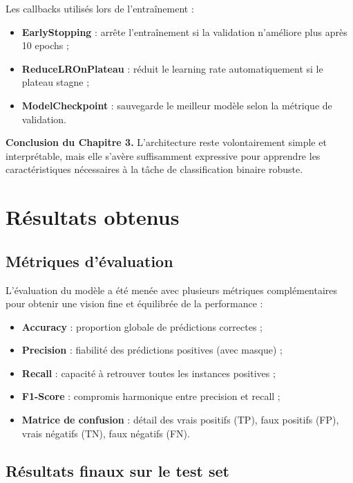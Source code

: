 \documentclass[11pt,a4paper]{article}
\begin{document}
Les callbacks utilisés lors de l'entraînement :
\begin{itemize}
    \item \textbf{EarlyStopping} : arrête l'entraînement si la validation n'améliore plus après 10 epochs ;
    \item \textbf{ReduceLROnPlateau} : réduit le learning rate automatiquement si le plateau stagne ;
    \item \textbf{ModelCheckpoint} : sauvegarde le meilleur modèle selon la métrique de validation.
\end{itemize}

\textbf{Conclusion du Chapitre 3.} L'architecture reste volontairement simple et interprétable, mais elle s'avère suffisamment expressive pour apprendre les caractéristiques nécessaires à la tâche de classification binaire robuste.

\newpage
\section{Résultats obtenus}

\subsection{Métriques d'évaluation}

L'évaluation du modèle a été menée avec plusieurs métriques complémentaires pour obtenir une vision fine et équilibrée de la performance :
\begin{itemize}
    \item \textbf{Accuracy} : proportion globale de prédictions correctes ;
    \item \textbf{Precision} : fiabilité des prédictions positives (avec masque) ;
    \item \textbf{Recall} : capacité à retrouver toutes les instances positives ;
    \item \textbf{F1-Score} : compromis harmonique entre precision et recall ;
    \item \textbf{Matrice de confusion} : détail des vrais positifs (TP), faux positifs (FP), vrais négatifs (TN), faux négatifs (FN).
\end{itemize}

\subsection{Résultats finaux sur le test set}
\end{document}
